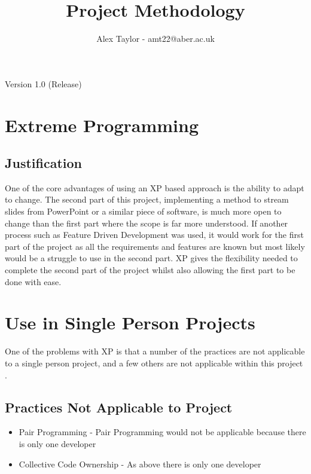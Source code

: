 \documentclass{article}
\title{Project Methodology}
\author{Alex Taylor - amt22@aber.ac.uk}
\begin{document}
\maketitle
\begin{center}
	Version 1.0 (Release)
\end{center}
\tableofcontents
\thispagestyle{empty}
\newpage

\section{Extreme Programming}
\subsection{Justification}
One of the core advantages of using an XP based approach is the ability to adapt to change. The second part of this project, implementing a method to stream slides from PowerPoint or a similar piece of software, is much more open to change than the first part where the scope is far more understood. If another process such as Feature Driven Development was used, it would work for the first part of the project as all the requirements and features are known but most likely would be a struggle to use in the second part. XP gives the flexibility needed to complete the second part of the project whilst also allowing the first part to be done with ease.
\newpage

\section{Use in Single Person Projects}
One of the problems with XP is that a number of the practices are not applicable to a single person project, and a few others are not applicable within this project \cite{akpata2004can}.
\subsection{Practices Not Applicable to Project}
\begin{itemize}
	\item Pair Programming - Pair Programming would not be applicable because there is only one developer
	\item Collective Code Ownership - As above there is only one developer
\end{itemize}
\end{document}
